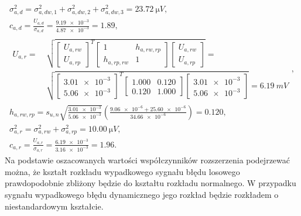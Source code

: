 \begin{gather}
\sigma_{a,d}^{2} = \sigma_{a,dw,1}^{2} + \sigma_{a,dw,2}^{2} + \sigma_{a,dw,3}^{2} = \qty{23.72}{\micro V} \label{eq:sym_parta_var_dyn}, \\
c_{a,d} = \frac{U_{a,d}}{\sigma_{a,d}} = \frac{\num{9.19e-3}}{\num{4.87e-3}} = \num{1.89} \label{eq:sym_parta_factor_dyn}, \\
\begin{split}
U_{a,r} =~
& \sqrt{
\begin{bmatrix}
U_{a,rw} \\ U_{a,rp}
\end{bmatrix}^{T}
\begin{bmatrix}
1           & h_{a,rw,rp} \\
h_{a,rp,rw} & 1
\end{bmatrix}
\begin{bmatrix}
U_{a,rw} \\ U_{a,rp}
\end{bmatrix}} =~\\
& \sqrt{
\begin{bmatrix}
\num{3.01e-3} \\ \num{5.06e-3}
\end{bmatrix}^{T}
\begin{bmatrix}
\num{1.000} & \num{0.120} \\
\num{0.120} & \num{1.000}
\end{bmatrix}
\begin{bmatrix}
\num{3.01e-3} \\ \num{5.06e-3}
\end{bmatrix}} = \qty{6.19}{mV}
\end{split}
\label{eq:sym_parta_uncert_rand}, \\
h_{a,rw,rp} = s_{u,n} \sqrt{\frac{\num{3.01e-3}}{\num{5.06e-3}}} \left( \frac{\num{9.06e-6} + \num{25.60e-6}}{\num{34.66e-6}} \right) = \num{0.120} \label{eq:sym_parta_coher_rw_rp}, \\
\sigma_{a,r}^{2} = \sigma_{a,rw}^{2} + \sigma_{a,rp}^{2} = \qty{10.00}{\micro V} \label{eq:sym_parta_var_rand}, \\
c_{a,r} = \frac{U_{a,r}}{\sigma_{a,r}} = \frac{\num{6.19e-3}}{\num{3.16e-3}} = \num{1.96} \label{eq:sym_parta_factor_rand}.
\end{gather}
Na podstawie oszacowanych wartości współczynników rozszerzenia podejrzewać można, że kształt rozkładu wypadkowego sygnału błędu losowego prawdopodobnie zbliżony będzie do kształtu rozkładu normalnego. W przypadku sygnału wypadkowego błędu dynamicznego jego rozkład będzie rozkładem o niestandardowym kształcie.

